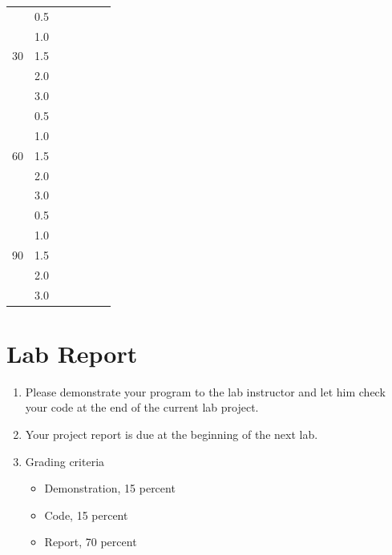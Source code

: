 \documentclass[letterpaper,12pt]{article}
\begin{document}
\begin{enumerate}
\begin{table}[H]
\begin{center}
\begin{tabular}{|c|c|c|c|c|c|c|}
                \multirow{5}{*}{30} & 0.5 & & & & \\ \cline{2-7}
                & 1.0 & & & & \\ \cline{2-7}
                & 1.5 & & & & \\ \cline{2-7}
                & 2.0 & & & & \\ \cline{2-7}
                & 3.0 & & & & \\ \cline{2-7}
                \multirow{5}{*}{60} & 0.5 & & & & \\ \cline{2-7}
                & 1.0 & & & & \\ \cline{2-7}
                & 1.5 & & & & \\ \cline{2-7}
                & 2.0 & & & & \\ \cline{2-7}
                & 3.0 & & & & \\ \cline{2-7}
                \multirow{5}{*}{90} & 0.5 & & & & \\ \cline{2-7}
                & 1.0 & & & & \\ \cline{2-7}
                & 1.5 & & & & \\ \cline{2-7}
                & 2.0 & & & & \\ \cline{2-7}
                & 3.0 & & & & \\ \cline{2-7}
            \end{tabular}
        \end{center}
        \end{table}
\end{enumerate}
\section*{Lab Report}
\begin{enumerate}
   \item Please demonstrate your program to the lab instructor and let him check your code at the end of the current lab project.
   \item Your project report is due at the beginning of the next lab.
   \item Grading criteria
      \begin{itemize}
         \item Demonstration, 15 percent
         \item Code, 15 percent
         \item Report, 70 percent
      \end{itemize}
\end{enumerate}
\end{document}
